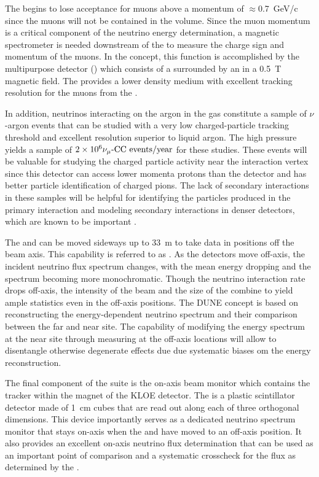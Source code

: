 The  begins to lose acceptance for muons above a momentum of 
$\approx$0.7~GeV/c since the muons will not be contained in the  volume.  Since the muon momentum is a critical component of the neutrino energy determination, a magnetic spectrometer is needed downstream of the  to measure the charge sign and momentum of the muons.  In the   concept, this function is accomplished by the multipurpose detector () which consists of a  surrounded by an  in a \SI{0.5}{T} magnetic field. The  provides a lower density medium with excellent tracking resolution for the muons from the .  

In addition, neutrinos interacting on the argon in the gas  constitute a sample of $\nu$-argon events that can be studied with a very low charged-particle tracking threshold and excellent resolution superior to liquid argon. The high pressure yields a sample of $\num{2e6}{\numu \text{-CC events/year}}$ for these studies. These events will be valuable for studying the charged particle activity near the interaction vertex since this detector can access lower momenta protons than the  detector and has better particle identification of charged pions.  The lack of secondary interactions in these samples will be helpful for identifying the particles produced in the primary interaction and modeling secondary interactions in denser detectors, which are known to be important \cite{Friedland:2018vry}.

The  and  can be moved sideways up to 33~m to take data in positions off the beam axis.  This capability is referred to as . As the detectors move off-axis, the incident neutrino flux spectrum changes, with the mean energy dropping and the spectrum becoming more monochromatic.  Though the neutrino interaction rate drops off-axis, the intensity of the beam and the size of the   combine to yield ample statistics even in the off-axis positions.
The DUNE concept is based on reconstructing the energy-dependent neutrino spectrum and
their comparison between the far and near site. The capability of modifying the energy spectrum at the near site through measuring at the off-axis locations will allow to disentangle otherwise degenerate effects due due systematic biases om the energy reconstruction.

The final component of the   suite is the on-axis beam monitor which contains the
 tracker within the magnet of the KLOE detector.  The  is a plastic scintillator detector made of \SI{1}{cm} cubes that are read out along each of three orthogonal dimensions.  
This device importantly serves as a dedicated  neutrino spectrum monitor that stays on-axis  when the  and  have moved to an off-axis position. 
It also provides an excellent on-axis neutrino flux determination that can be used as an important point of comparison and a systematic crosscheck for the flux as determined by the .


